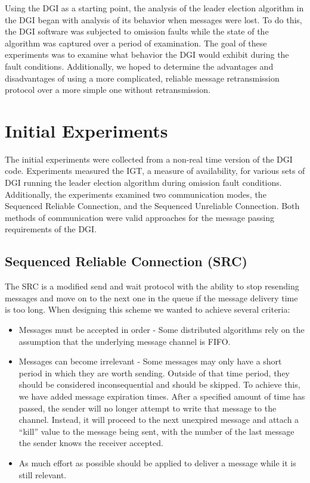 Using the DGI as a starting point, the analysis of the leader election algorithm in the DGI began with analysis of its behavior when messages were lost.
To do this, the DGI software was subjected to omission faults while the state of the algorithm was captured over a period of examination.
The goal of these experiments was to examine what behavior the DGI would exhibit during the fault conditions.
Additionally, we hoped to determine the advantages and disadvantages of using a more complicated, reliable message retransmission protocol over a more simple one without retransmission.

\section{Initial Experiments}

The initial experiments were collected from a non-real time version of the DGI code.
Experiments measured the \ac{IGT}, a measure of availability, for various sets of DGI running the leader election algorithm during omission fault conditions.
Additionally, the experiments examined two communication modes, the Sequenced Reliable Connection, and the Sequenced Unreliable Connection.
Both methods of communication were valid approaches for the message passing requirements of the DGI.

\subsection{Sequenced Reliable Connection (SRC)}

The \ac{SRC} is a modified send and wait protocol with the ability to stop resending messages and move on to the next one in the queue if the message delivery time is too long. When designing this scheme we wanted to achieve several criteria:

\begin{itemize}
\item Messages must be accepted in order - Some distributed algorithms rely on the assumption that the underlying message channel is FIFO.
\item Messages can become irrelevant - Some messages may only have a short period in which they are worth sending. Outside of that time period, they should be considered inconsequential and should be skipped. To achieve this, we have added message expiration times. After a specified amount of time has passed, the sender will no longer attempt to write that message to the channel. Instead, it will proceed to the next unexpired message and attach a ``kill'' value to the message being sent, with the number of the last message the sender knows the receiver accepted.
\item As much effort as possible should be applied to deliver a message while it is still relevant.
\end{itemize}

